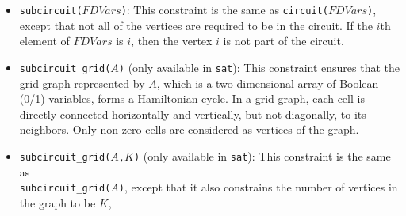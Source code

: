 \begin{itemize}
\item \texttt{subcircuit($FDVars$)}: This constraint is the same as \texttt{circuit($FDVars$)}, except that not all of the vertices are required to be in the circuit. If the $i$th element of $FDVars$ is $i$, then the vertex $i$ is not part of the circuit. 

\item \texttt{subcircuit\_grid($A$)} (only available in \texttt{sat}): This constraint ensures that the grid graph represented by $A$, which is a two-dimensional array of Boolean (0/1) variables, forms a Hamiltonian cycle. In a grid graph, each cell is directly connected horizontally and vertically, but not diagonally, to its neighbors. Only non-zero cells are considered as vertices of the graph.

\item \texttt{subcircuit\_grid($A$,$K$)} (only available in \texttt{sat}): This constraint is the same as \\\texttt{subcircuit\_grid($A$)}, except that it also constrains the number of vertices in the graph to be $K$, 
\end{itemize}

